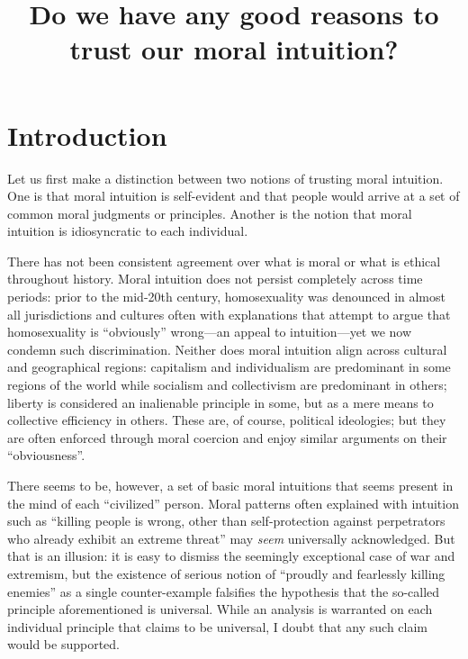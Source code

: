 \documentclass{scrartcl}
\title{Do we have any good reasons to trust our moral intuition?}
\author{}
\date{}
\begin{document}
\maketitle


\section{Introduction}

Let us first make a distinction between two notions of trusting moral intuition. One is that moral intuition is self-evident and that people would arrive at a set of common moral judgments or principles. Another is the notion that moral intuition is idiosyncratic to each individual.

There has not been consistent agreement over what is moral or what is ethical throughout history. Moral intuition does not persist completely across time periods: prior to the mid-20th century, homosexuality was denounced in almost all jurisdictions and cultures often with explanations that attempt to argue that homosexuality is ``obviously'' wrong---an appeal to intuition---yet we now condemn such discrimination. Neither does moral intuition align across cultural and geographical regions: capitalism and individualism are predominant in some regions of the world while socialism and collectivism are predominant in others; liberty is considered an inalienable principle in some, but as a mere means to collective efficiency in others. These are, of course, political ideologies; but they are often enforced through moral coercion and enjoy similar arguments on their ``obviousness''.

There seems to be, however, a set of basic moral intuitions that seems present in the mind of each ``civilized'' person. Moral patterns often explained with intuition such as ``killing people is wrong, other than self-protection against perpetrators who already exhibit an extreme threat'' may \emph{seem} universally acknowledged. But that is an illusion: it is easy to dismiss the seemingly exceptional case of war and extremism, but the existence of serious notion of ``proudly and fearlessly killing enemies'' as a single counter-example falsifies the hypothesis that the so-called principle aforementioned is universal. While an analysis is warranted on each individual principle that claims to be universal, I doubt that any such claim would be supported.%
\end{document}
